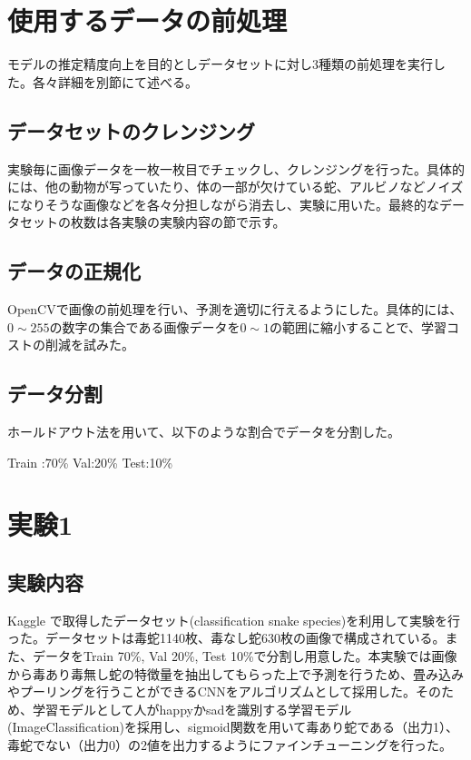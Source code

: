 \documentclass[a4paper, 11pt, titlepage]{jsarticle}
\begin{document}
\section{使用するデータの前処理}
モデルの推定精度向上を目的としデータセットに対し3種類の前処理を実行した。各々詳細を別節にて述べる。

\subsection{データセットのクレンジング}
実験毎に画像データを一枚一枚目でチェックし、クレンジングを行った。具体的には、他の動物が写っていたり、体の一部が欠けている蛇、アルビノなどノイズになりそうな画像などを各々分担しながら消去し、実験に用いた。最終的なデータセットの枚数は各実験の実験内容の節で示す。

\subsection{データの正規化}
OpenCVで画像の前処理を行い、予測を適切に行えるようにした。具体的には、$0\sim255$の数字の集合である画像データを$0\sim1$の範囲に縮小することで、学習コストの削減を試みた。

\subsection{データ分割}
ホールドアウト法を用いて、以下のような割合でデータを分割した。\par
Train :70\%
Val:20\%
Test:10\%

\section{実験1}
\subsection{実験内容}
Kaggle で取得したデータセット(classification snake species\cite{theme3})を利用して実験を行った。データセットは毒蛇1140枚、毒なし蛇630枚の画像で構成されている。また、データをTrain 70\%, Val 20\%, Test 10\%で分割し用意した。本実験では画像から毒あり毒無し蛇の特徴量を抽出してもらった上で予測を行うため、畳み込みやプーリングを行うことができるCNNをアルゴリズムとして採用した。そのため、学習モデルとして人がhappyかsadを識別する学習モデル(ImageClassification\cite{theme4})を採用し、sigmoid関数を用いて毒あり蛇である（出力1）、毒蛇でない（出力0）の2値を出力するようにファインチューニングを行った。\par
\end{document}
